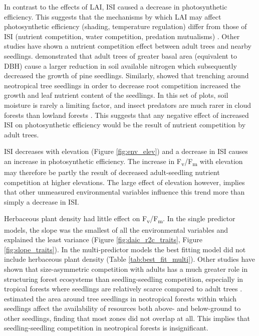 \documentclass[a4paper,10pt,]{report}
\begin{document}
In contrast to the effects of LAI, ISI caused a decrease in photosynthetic efficiency. This suggests that the mechanisms by which LAI may affect photosynthetic efficiency (shading, temperature regulation) differ from those of ISI (nutrient competition, water competition, predation mutualisms) \citep{Lewis2000}. Other studies have shown a nutrient competition effect between adult trees and nearby seedlings. \citet{Palik1997} demonstrated that adult trees of greater basal area (equivalent to DBH) cause a larger reduction in soil available nitrogen which subsequently decreased the growth of pine seedlings. Similarly, \citet{Barberis2005} showed that trenching around neotropical tree seedlings in order to decrease root competition increased the growth and leaf nutrient content of the seedlings. In this set of plots, soil moisture is rarely a limiting factor, and insect predators are much rarer in cloud forests than lowland forests \citep{Rodriguez-Castaeda2010}. This suggests that any negative effect of increased ISI on photosynthetic efficiency would be the result of nutrient competition by adult trees.

ISI decreases with elevation (Figure \ref{fig:env_elev}) and a decrease in ISI causes an increase in photosynthetic efficiency. The increase in F\textsubscript{v}/F\textsubscript{m} with elevation may therefore be partly the result of decreased adult-seedling nutrient competition at higher elevations. The large effect of elevation however, implies that other unmeasured environmental variables influence this trend more than simply  a decrease in ISI.

Herbaceous plant density had little effect on F\textsubscript{v}/F\textsubscript{m}. In the single predictor models, the slope was the smallest of all the environmental variables and explained the least variance (Figure \ref{fig:daic_r2c_traits}, Figure \ref{fig:slope_traits}). In the multi-predictor models the best fitting model did not include herbaceous plant density (Table \ref{tab:best_fit_multi}). Other studies have shown that size-asymmetric competition with adults has a much greater role in structuring forest ecosystems than seedling-seedling competition, especially in tropical forests where seedlings are relatively scarce compared to adult trees \citep{Moles2004, Powers2004}. \citet{Paine2008} estimated the area around tree seedlings in neotropical forests within which seedlings affect the availability of resources both above- and below-ground to other seedlings, finding that most zones did not overlap at all. This implies that seedling-seedling competition in neotropical forests is insignificant. 
\end{document}
